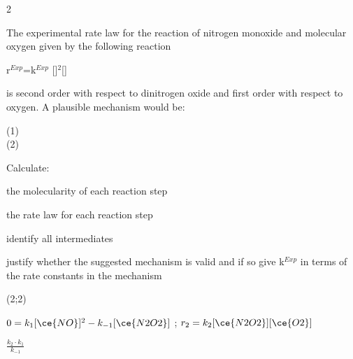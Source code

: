 \documentclass[main.tex]{subfiles}
\begin{document}
\begin{multicols*}{2}
\begin{question}[ID=\the\value{numA}]
The experimental rate law for the reaction of nitrogen monoxide and molecular oxygen given by the following reaction
  \begin{center}	\hfill r$^{Exp}$=k$^{Exp}$ []$^2$[]\end{center}
is second order with respect to dinitrogen oxide and first order with respect to oxygen. A plausible mechanism would be:
  \begin{center}(1)\hfill{} \\
(2)\hfill{} 
\end{center}
Calculate: 
\begin{inparaenum}[(a)]	
\item  the molecularity of each reaction step %
\item  the rate law for each reaction step %
\item identify all intermediates %
\item justify whether the suggested mechanism is valid and if so give k$^{Exp}$ in terms of the rate constants in the mechanism %
 \end{inparaenum}
\end{question}
\begin{solution}
\begin{inparaenum}[(a)]
\item   (2;2)
\item   $0=k_1[\ce{NO}]^2-k_{-1}[\ce{N2O2}]$ ; $r_2=k_2[\ce{N2O2}][\ce{O2}]$		 
\item  {} 
\item  $\frac{k_2\cdot k_1}{k_{-1}}$
 \end{inparaenum}
\hspace{0.1cm}\end{solution}%





\end{multicols*}
\end{document}

